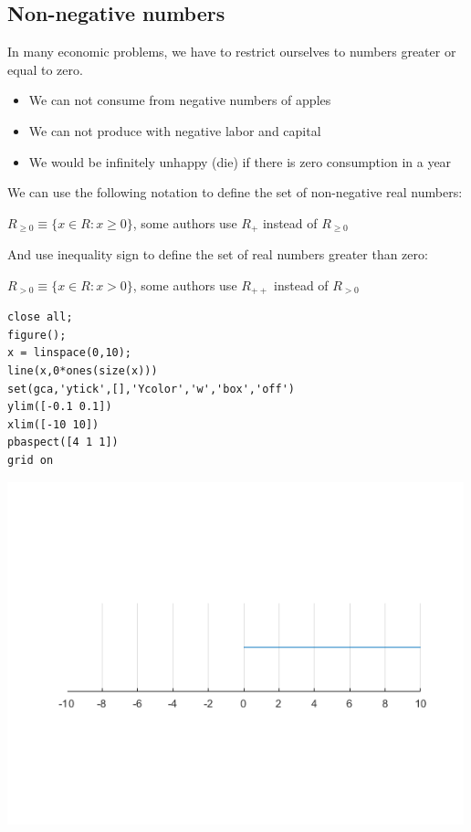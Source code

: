 \documentclass[
]{book}
\begin{document}
\hypertarget{non-negative-numbers}{%
\subsection{Non-negative numbers}\label{non-negative-numbers}}

In many economic problems, we have to restrict ourselves to numbers
greater or equal to zero.

\begin{itemize}
\item
  We can not consume from negative numbers of apples
\item
  We can not produce with negative labor and capital
\item
  We would be infinitely unhappy (die) if there is zero consumption in
  a year
\end{itemize}

We can use the following notation to define the set of non-negative real
numbers:

\({{R_{\ge 0} }}\equiv \lbrace x\in {R}:x\ge 0\rbrace\), some authors use
\({{R_+ }}\) instead of \({{R_{\ge 0} }}\)

And use inequality sign to define the set of real numbers greater than
zero:

\({{R_{>0} }}\equiv \lbrace x\in {R}:x>0\rbrace\), some authors use
\({{R_{++} }}\) instead of \({{R_{>0} }}\)

\begin{verbatim}
close all;
figure();
x = linspace(0,10);
line(x,0*ones(size(x)))
set(gca,'ytick',[],'Ycolor','w','box','off')
ylim([-0.1 0.1])
xlim([-10 10])
pbaspect([4 1 1])
grid on
\end{verbatim}

\includegraphics[width=5.20833in,height=\textheight]{img/realnumber_images/figure_1.png}
\end{document}
